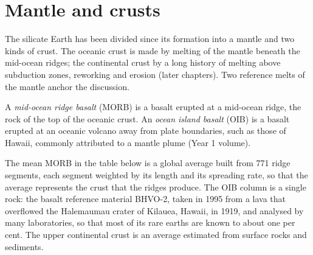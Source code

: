 \section{Mantle and crusts}

The silicate Earth has been divided since its formation into a mantle and two
kinds of crust. The oceanic crust is made by melting of the mantle beneath the
mid-ocean ridges; the continental crust by a long history of melting above
subduction zones, reworking and erosion (later chapters). Two reference melts
of the mantle anchor the discussion.

\begin{definition}
\label{def:b2:elements-in-the-earth:morb-oib}
A \emph{mid-ocean ridge basalt} (MORB) is a basalt
erupted at a mid-ocean ridge, the rock of the top of the oceanic crust. An
\emph{ocean island basalt} (OIB) is a basalt erupted
at an oceanic volcano away from plate boundaries, such as those of Hawaii,
commonly attributed to a mantle plume (Year 1 volume).
\end{definition}

The mean MORB in the table below is a global average built from 771 ridge
segments, each segment weighted by its length and its spreading rate, so that the
average represents the crust that the ridges produce. The OIB
column is a single rock: the basalt reference material BHVO-2, taken in 1995
from a lava that overflowed the Halemaumau crater of Kilauea, Hawaii, in 1919,
and analysed by many laboratories, so that most of its rare earths are known to
about one per cent. The upper continental crust is an average estimated from
surface rocks and sediments.

